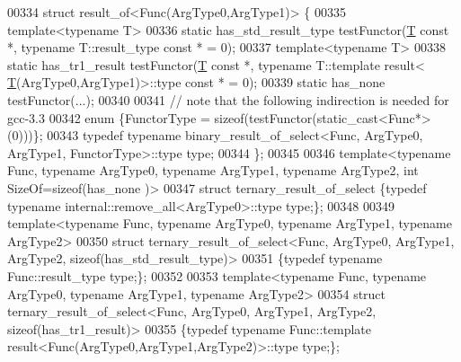 \begin{DoxyCode}
00334 \textcolor{keyword}{struct }result\_of<Func(ArgType0,ArgType1)> \{
00335     \textcolor{keyword}{template}<\textcolor{keyword}{typename} T>
00336     \textcolor{keyword}{static} has\_std\_result\_type    testFunctor(\hyperlink{group___sparse_core___module_class_eigen_1_1_triplet}{T} \textcolor{keyword}{const} *, \textcolor{keyword}{typename} T::result\_type \textcolor{keyword}{const} * = 0);
00337     \textcolor{keyword}{template}<\textcolor{keyword}{typename} T>
00338     \textcolor{keyword}{static} has\_tr1\_result         testFunctor(\hyperlink{group___sparse_core___module_class_eigen_1_1_triplet}{T} \textcolor{keyword}{const} *, \textcolor{keyword}{typename} T::template result<
      \hyperlink{group___sparse_core___module_class_eigen_1_1_triplet}{T}(ArgType0,ArgType1)>::type \textcolor{keyword}{const} * = 0);
00339     \textcolor{keyword}{static} has\_none               testFunctor(...);
00340 
00341     \textcolor{comment}{// note that the following indirection is needed for gcc-3.3}
00342     \textcolor{keyword}{enum} \{FunctorType = \textcolor{keyword}{sizeof}(testFunctor(static\_cast<Func*>(0)))\};
00343     \textcolor{keyword}{typedef} \textcolor{keyword}{typename} binary\_result\_of\_select<Func, ArgType0, ArgType1, FunctorType>::type type;
00344 \};
00345 
00346 \textcolor{keyword}{template}<\textcolor{keyword}{typename} Func, \textcolor{keyword}{typename} ArgType0, \textcolor{keyword}{typename} ArgType1, \textcolor{keyword}{typename} ArgType2, \textcolor{keywordtype}{int} SizeOf=sizeof(has\_none
      )>
00347 \textcolor{keyword}{struct }ternary\_result\_of\_select \{\textcolor{keyword}{typedef} \textcolor{keyword}{typename} internal::remove\_all<ArgType0>::type type;\};
00348 
00349 \textcolor{keyword}{template}<\textcolor{keyword}{typename} Func, \textcolor{keyword}{typename} ArgType0, \textcolor{keyword}{typename} ArgType1, \textcolor{keyword}{typename} ArgType2>
00350 \textcolor{keyword}{struct }ternary\_result\_of\_select<Func, ArgType0, ArgType1, ArgType2, sizeof(has\_std\_result\_type)>
00351 \{\textcolor{keyword}{typedef} \textcolor{keyword}{typename} Func::result\_type type;\};
00352 
00353 \textcolor{keyword}{template}<\textcolor{keyword}{typename} Func, \textcolor{keyword}{typename} ArgType0, \textcolor{keyword}{typename} ArgType1, \textcolor{keyword}{typename} ArgType2>
00354 \textcolor{keyword}{struct }ternary\_result\_of\_select<Func, ArgType0, ArgType1, ArgType2, sizeof(has\_tr1\_result)>
00355 \{\textcolor{keyword}{typedef} \textcolor{keyword}{typename} Func::template result<Func(ArgType0,ArgType1,ArgType2)>::type type;\};

\end{DoxyCode}
